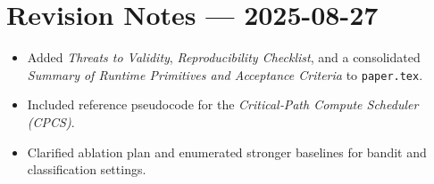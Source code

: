 \hypertarget{revision-notes-2025-08-27}{%
\section{Revision Notes --- 2025-08-27}}
\begin{itemize}
  \item Added \emph{Threats to Validity}, \emph{Reproducibility Checklist}, and a consolidated \emph{Summary of Runtime Primitives and Acceptance Criteria} to \texttt{paper.tex}.
  \item Included reference pseudocode for the \emph{Critical‑Path Compute Scheduler (CPCS)}.
  \item Clarified ablation plan and enumerated stronger baselines for bandit and classification settings.
\end{itemize}


